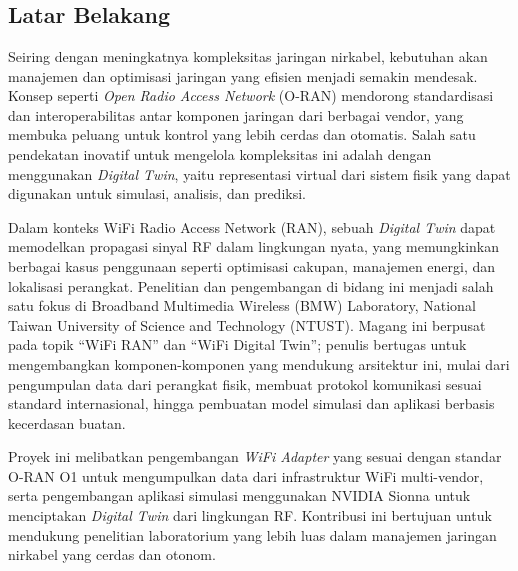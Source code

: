\chapter{\babSatu}

\section{Latar Belakang}
Seiring dengan meningkatnya kompleksitas jaringan nirkabel, kebutuhan akan manajemen dan optimisasi jaringan yang efisien menjadi semakin mendesak. Konsep seperti \textit{Open Radio Access Network} (O-RAN) mendorong standardisasi dan interoperabilitas antar komponen jaringan dari berbagai vendor, yang membuka peluang untuk kontrol yang lebih cerdas dan otomatis. Salah satu pendekatan inovatif untuk mengelola kompleksitas ini adalah dengan menggunakan \textit{Digital Twin}, yaitu representasi virtual dari sistem fisik yang dapat digunakan untuk simulasi, analisis, dan prediksi.

Dalam konteks WiFi Radio Access Network (RAN), sebuah \textit{Digital Twin} dapat memodelkan propagasi sinyal RF dalam lingkungan nyata, yang memungkinkan berbagai kasus penggunaan seperti optimisasi cakupan, manajemen energi, dan lokalisasi perangkat. Penelitian dan pengembangan di bidang ini menjadi salah satu fokus di Broadband Multimedia Wireless (BMW) Laboratory, National Taiwan University of Science and Technology (NTUST). Magang ini berpusat pada topik ``WiFi RAN'' dan ``WiFi Digital Twin''; penulis bertugas untuk mengembangkan komponen-komponen yang mendukung arsitektur ini, mulai dari pengumpulan data dari perangkat fisik, membuat protokol komunikasi sesuai standard internasional, hingga pembuatan model simulasi dan aplikasi berbasis kecerdasan buatan.

Proyek ini melibatkan pengembangan \textit{WiFi Adapter} yang sesuai dengan standar O-RAN O1 untuk mengumpulkan data dari infrastruktur WiFi multi-vendor, serta pengembangan aplikasi simulasi menggunakan NVIDIA Sionna untuk menciptakan \textit{Digital Twin} dari lingkungan RF. Kontribusi ini bertujuan untuk mendukung penelitian laboratorium yang lebih luas dalam manajemen jaringan nirkabel yang cerdas dan otonom.

